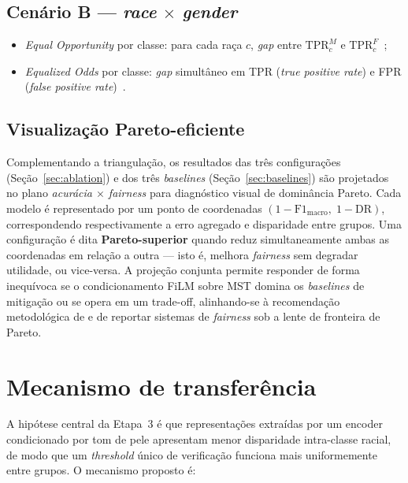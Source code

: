 \subsection{Cenário B --- \emph{race} $\times$ \emph{gender}}
\begin{itemize}
\item \emph{Equal Opportunity} por classe: para cada raça $c$, \emph{gap} entre $\mathrm{TPR}_c^{M}$ e $\mathrm{TPR}_c^{F}$~\cite{hardt2016equality};
\item \emph{Equalized Odds} por classe: \emph{gap} simultâneo em TPR (\emph{true positive rate}) e FPR (\emph{false positive rate})~\cite{hardt2016equality}.
\end{itemize}

\subsection{Visualização Pareto-eficiente}
\label{sec:pareto}

Complementando a triangulação, os resultados das três configurações (Seção~\ref{sec:ablation}) e dos três \emph{baselines} (Seção~\ref{sec:baselines}) são projetados no plano \emph{acurácia $\times$ fairness} para diagnóstico visual de dominância Pareto. Cada modelo é representado por um ponto de coordenadas $(1 - \mathrm{F1_{macro}},\; 1 - \mathrm{DR})$, correspondendo respectivamente a erro agregado e disparidade entre grupos. Uma configuração é dita \textbf{Pareto-superior} quando reduz simultaneamente ambas as coordenadas em relação a outra --- isto é, melhora \emph{fairness} sem degradar utilidade, ou vice-versa. A projeção conjunta permite responder de forma inequívoca se o condicionamento FiLM sobre MST domina os \emph{baselines} de mitigação ou se opera em um trade-off, alinhando-se à recomendação metodológica de  e  de reportar sistemas de \emph{fairness} sob a lente de fronteira de Pareto.

\section{Mecanismo de transferência}
\label{sec:mecanismo_transferencia}

A hipótese central da Etapa~3 é que representações extraídas por um encoder condicionado por tom de pele apresentam menor disparidade intra-classe racial, de modo que um \emph{threshold} único de verificação funciona mais uniformemente entre grupos. O mecanismo proposto é:

